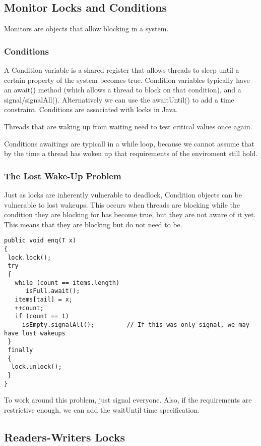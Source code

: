 \documentclass[11pt]{article}
\begin{document}
\subsection{Monitor Locks and Conditions}
\label{sec:orgheadline14}

Monitors are objects that allow blocking in a system.

\subsubsection{Conditions}
\label{sec:orgheadline12}

A Condition variable is a shared register that allows threads to sleep until a certain property
of the system becomes true. Condition variables typically have an await() method (which allows
a thread to block on that condition), and a signal/signalAll(). Alternatively we can use the 
awaitUntil() to add a time constraint. Conditions are associated with locks in Java.

Threads that are waking up from waiting need to test critical values once again.

Conditions awaitings are typicall in a while loop, because we cannot assume that by the time a
thread has woken up that requirements of the enviroment still hold.

\subsubsection{The Lost Wake-Up Problem}
\label{sec:orgheadline13}

Just as locks are inherently vulnerable to deadlock, Condition objects can be  vulnerable to
lost wakeups. This occurs when threads are blocking while the condition they are blocking for
has become true, but they are not aware of it yet. This means that they are blocking but do
not need to be.

\begin{verbatim}
public void enq(T x)
{
 lock.lock();
 try
 {
   while (count == items.length)
      isFull.await();
   items[tail] = x;
   ++count;
   if (count == 1)
     isEmpty.signalAll();         // If this was only signal, we may have lost wakeups
 }
 finally
 {
  lock.unlock();
 }
}
\end{verbatim}

To work around this problem, just signal everyone. Also, if the requirements are restrictive
enough, we can add the waitUntil time specification.

\subsection{Readers-Writers Locks}
\label{sec:orgheadline17}
\end{document}
